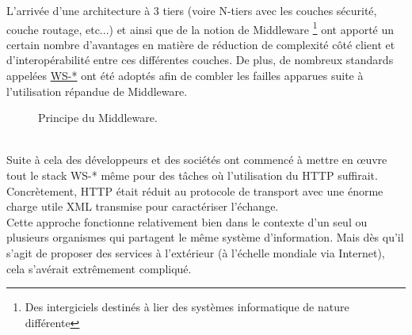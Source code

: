 L'arrivée d'une architecture à 3 tiers (voire N-tiers avec les couches sécurité, couche routage, etc...) et ainsi que de la notion de Middleware \footnote{Des intergiciels destinés à lier des systèmes informatique de nature différente }  ont apporté un certain nombre d'avantages en matière de réduction de complexité côté client et d'interopérabilité entre ces différentes couches. De plus, de nombreux standards appelées \href{https://fr.wikipedia.org/wiki/Liste_des_sp%C3%A9cifications_des_services_web_WS-*}{WS-*} 
	ont été adoptés afin de combler les failles apparues suite à l'utilisation répandue de Middleware. 
	\begin{figure}[h!]
		\centering
		\caption{Principe du Middleware.}
		\label{fig:mainframe}
	\end{figure}
	\\
Suite à cela des développeurs et des sociétés ont commencé à mettre en œuvre tout le stack WS-* même pour des tâches où l'utilisation du HTTP suffirait. Concrètement, HTTP était réduit au protocole de transport avec une énorme charge utile XML transmise pour caractériser l'échange. 
\\
Cette approche fonctionne relativement bien dans le contexte d'un seul ou plusieurs organismes qui partagent le même système d'information. Mais dès qu'il s'agit de proposer des services à l'extérieur (à l'échelle mondiale via Internet), cela s'avérait extrêmement compliqué. 
\newpage






